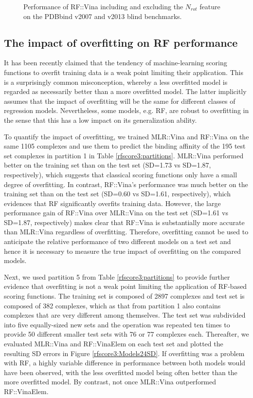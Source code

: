 \begin{figure}
{}
\caption{Performance of RF::Vina including and excluding the $N_{rot}$ feature on the PDBbind v2007 and v2013 blind benchmarks.}
\label{rfscore3:models-3-and-5}
\end{figure}

\subsection{The impact of overfitting on RF performance}

It has been recently claimed \citep{1372} that the tendency of machine-learning scoring functions to overfit training data is a weak point limiting their application. This is a surprisingly common misconception, whereby a less overfitted model is regarded as necessarily better than a more overfitted model. The latter implicitly assumes that the impact of overfitting will be the same for different classes of regression models. Nevertheless, some models, e.g. RF, are robust to overfitting in the sense that this has a low impact on its generalization ability.

To quantify the impact of overfitting, we trained MLR::Vina and RF::Vina on the same 1105 complexes and use them to predict the binding affinity of the 195 test set complexes in partition 1 in Table \ref{rfscore3:partitions}. MLR::Vina performed better on the training set than on the test set (SD=1.73 vs SD=1.87, respectively), which suggests that classical scoring functions only have a small degree of overfitting. In contrast, RF::Vina's performance was much better on the training set than on the test set (SD=0.60 vs SD=1.61, respectively), which evidences that RF significantly overfits training data. However, the large performance gain of RF::Vina over MLR::Vina on the test set (SD=1.61 vs SD=1.87, respectively) makes clear that RF::Vina is substantially more accurate than MLR::Vina regardless of overfitting. Therefore, overfitting cannot be used to anticipate the relative performance of two different models on a test set and hence it is necessary to measure the true impact of overfitting on the compared models.

Next, we used partition 5 from Table \ref{rfscore3:partitions} to provide further evidence that overfitting is not a weak point limiting the application of RF-based scoring functions. The training set is composed of 2897 complexes and test set is composed of 382 complexes, which as that from partition 1 also contains complexes that are very different among themselves. The test set was subdivided into five equally-sized new sets and the operation was repeated ten times to provide 50 different smaller test sets with 76 or 77 complexes each. Thereafter, we evaluated MLR::Vina and RF::VinaElem on each test set and plotted the resulting SD errors in Figure \ref{rfscore3:Models24SD}. If overfitting was a problem with RF, a highly variable difference in performance between both models would have been observed, with the less overfitted model being often better than the more overfitted model. By contrast, not once MLR::Vina outperformed RF::VinaElem. 


